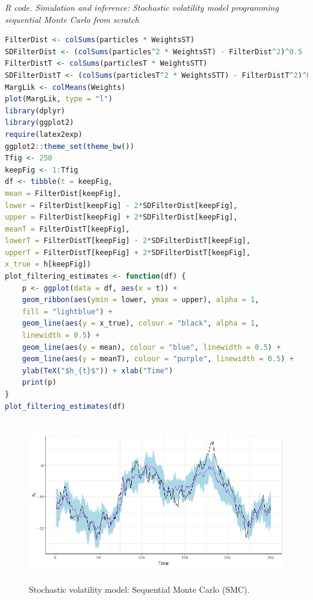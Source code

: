 \begin{tcolorbox}[enhanced,width=4.67in,center upper,
	fontupper=\large\bfseries,drop shadow southwest,sharp corners]
	\textit{R code. Simulation and inference: Stochastic volatility model programming sequential Monte Carlo from scratch}
	\begin{VF}
		\begin{lstlisting}[language=R]
FilterDist <- colSums(particles * WeightsST)
SDFilterDist <- (colSums(particles^2 * WeightsST) - FilterDist^2)^0.5
FilterDistT <- colSums(particlesT * WeightsSTT)
SDFilterDistT <- (colSums(particlesT^2 * WeightsSTT) - FilterDistT^2)^0.5
MargLik <- colMeans(Weights)
plot(MargLik, type = "l")
library(dplyr)
library(ggplot2)
require(latex2exp)
ggplot2::theme_set(theme_bw())
Tfig <- 250
keepFig <- 1:Tfig
df <- tibble(t = keepFig,
mean = FilterDist[keepFig],
lower = FilterDist[keepFig] - 2*SDFilterDist[keepFig],
upper = FilterDist[keepFig] + 2*SDFilterDist[keepFig],
meanT = FilterDistT[keepFig],
lowerT = FilterDistT[keepFig] - 2*SDFilterDistT[keepFig],
upperT = FilterDistT[keepFig] + 2*SDFilterDistT[keepFig],
x_true = h[keepFig])
plot_filtering_estimates <- function(df) {
	p <- ggplot(data = df, aes(x = t)) +
	geom_ribbon(aes(ymin = lower, ymax = upper), alpha = 1,
	fill = "lightblue") +
	geom_line(aes(y = x_true), colour = "black", alpha = 1,
	linewidth = 0.5) +
	geom_line(aes(y = mean), colour = "blue", linewidth = 0.5) +
	geom_line(aes(y = meanT), colour = "purple", linewidth = 0.5) +
	ylab(TeX("$h_{t}$")) + xlab("Time")
	print(p)
}
plot_filtering_estimates(df)
\end{lstlisting}
	\end{VF}
\end{tcolorbox} 

 
\begin{figure}[!h]
	\includegraphics[width=340pt, height=200pt]{Chapters/chapter8/figures/SVSMC.png}
	\caption[List of figure caption goes here]{Stochastic volatility model: Sequential Monte Carlo (SMC).}\label{fig5}
\end{figure} 
  
